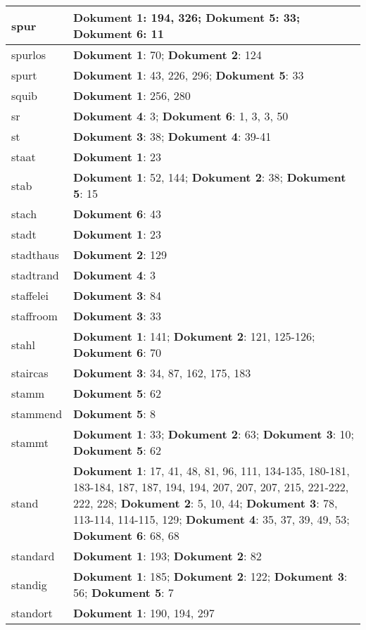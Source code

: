 \documentclass[a5paper]{article}
\begin{document}
\begin{longtable}[l]{|l|p{3in}|}
\hline
spur & \textbf{Dokument 1}: 194, 326; \textbf{Dokument 5}: 33; \textbf{Dokument 6}: 11 \\
\hline
spurlos & \textbf{Dokument 1}: 70; \textbf{Dokument 2}: 124 \\
\hline
spurt & \textbf{Dokument 1}: 43, 226, 296; \textbf{Dokument 5}: 33 \\
\hline
squib & \textbf{Dokument 1}: 256, 280 \\
\hline
sr & \textbf{Dokument 4}: 3; \textbf{Dokument 6}: 1, 3, 3, 50 \\
\hline
st & \textbf{Dokument 3}: 38; \textbf{Dokument 4}: 39-41 \\
\hline
staat & \textbf{Dokument 1}: 23 \\
\hline
stab & \textbf{Dokument 1}: 52, 144; \textbf{Dokument 2}: 38; \textbf{Dokument 5}: 15 \\
\hline
stach & \textbf{Dokument 6}: 43 \\
\hline
stadt & \textbf{Dokument 1}: 23 \\
\hline
stadthaus & \textbf{Dokument 2}: 129 \\
\hline
stadtrand & \textbf{Dokument 4}: 3 \\
\hline
staffelei & \textbf{Dokument 3}: 84 \\
\hline
staffroom & \textbf{Dokument 3}: 33 \\
\hline
stahl & \textbf{Dokument 1}: 141; \textbf{Dokument 2}: 121, 125-126; \textbf{Dokument 6}: 70 \\
\hline
staircas & \textbf{Dokument 3}: 34, 87, 162, 175, 183 \\
\hline
stamm & \textbf{Dokument 5}: 62 \\
\hline
stammend & \textbf{Dokument 5}: 8 \\
\hline
stammt & \textbf{Dokument 1}: 33; \textbf{Dokument 2}: 63; \textbf{Dokument 3}: 10; \textbf{Dokument 5}: 62 \\
\hline
stand & \textbf{Dokument 1}: 17, 41, 48, 81, 96, 111, 134-135, 180-181, 183-184, 187, 187, 194, 194, 207, 207, 207, 215, 221-222, 222, 228; \textbf{Dokument 2}: 5, 10, 44; \textbf{Dokument 3}: 78, 113-114, 114-115, 129; \textbf{Dokument 4}: 35, 37, 39, 49, 53; \textbf{Dokument 6}: 68, 68 \\
\hline
standard & \textbf{Dokument 1}: 193; \textbf{Dokument 2}: 82 \\
\hline
standig & \textbf{Dokument 1}: 185; \textbf{Dokument 2}: 122; \textbf{Dokument 3}: 56; \textbf{Dokument 5}: 7 \\
\hline
standort & \textbf{Dokument 1}: 190, 194, 297 \\

\end{longtable}
\end{document}
